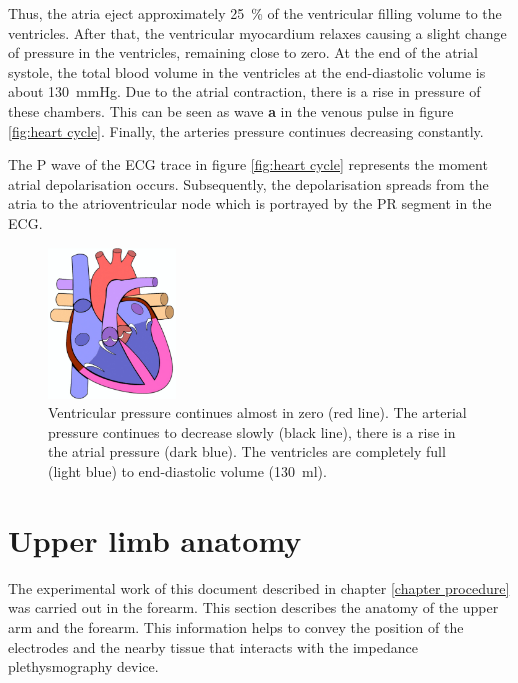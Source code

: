 Thus, the atria eject approximately \SI{25}{\percent} of the ventricular filling volume to the ventricles. After that, the ventricular myocardium relaxes causing a slight change of pressure in the ventricles, remaining close to zero. At the end of the atrial systole, the total blood volume in the ventricles at the end-diastolic volume is about \SI{130}{\mmHg}. Due to the atrial contraction, there is a rise in pressure of these chambers. This can be seen as wave \textbf{a} in the venous pulse in figure \ref{fig:heart cycle}. Finally, the arteries pressure continues decreasing constantly.

The P wave of the ECG trace in figure \ref{fig:heart cycle} represents the moment atrial depolarisation occurs. Subsequently, the depolarisation spreads from the atria to the atrioventricular node which is portrayed by the PR segment in the ECG.

\begin{figure}[!htpb]
		\centering
		\includegraphics[height=4cm,keepaspectratio]{figure_17}
		\caption[Heart's chambers movement during Atrial systole]{Ventricular pressure continues almost in zero (red line). The arterial pressure continues to decrease slowly (black line), there is a rise in the atrial pressure (dark blue). The ventricles are completely full (light blue) to end-diastolic volume (\SI{130}{\milli\litre}).}
		\label{fig:heart atrial systole}
\end{figure}

 
\section{Upper limb anatomy}
The experimental work of this document described in chapter \ref{chapter procedure} was carried out in the forearm. This section describes the anatomy of the upper arm and the forearm. This information helps to convey the position of the electrodes and the nearby tissue that interacts with the impedance plethysmography device. 

